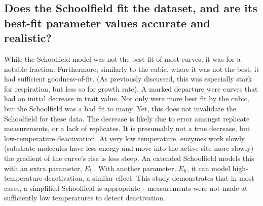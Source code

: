 \documentclass[11pt]{article}
\begin{document}
\subsection*{Does the Schoolfield fit the dataset, and are its best-fit parameter values accurate and realistic?}
While the Schoolfield model was not the best fit of most curves, it was for a notable fraction. Furthermore, similarly to the cubic, where it was not the best, it had sufficient goodness-of-fit. (As previously discussed, this was especially stark for respiration, but less so for growth rate). A marked departure were curves that had an initial decrease in trait value. Not only were more best fit by the cubic, but the Schoolfield was a bad fit to many.
Yet, this does not invalidate the Schoolfield for these data.
The decrease is likely due to error amongst replicate measurements, or a lack of replicates. It is presumably not a true decrease, but low-temperature deactivation.
At very low temperature, enzymes work slowly (substrate molecules have less energy and move into the active site more slowly) %
- the gradient of the curve's rise is less steep.
An extended Schoolfield models this with an extra parameter, $E_{l}$ \cite{SchoolfieldSharpe1981}.
With another parameter, $E_{h}$, it can model high-temperature deactivation, a similar effect.
This study demonstrates that in most cases, a simplified Schoolfield is appropriate - measurements were not made at sufficiently low temperatures to detect deactivation.



\end{document}
